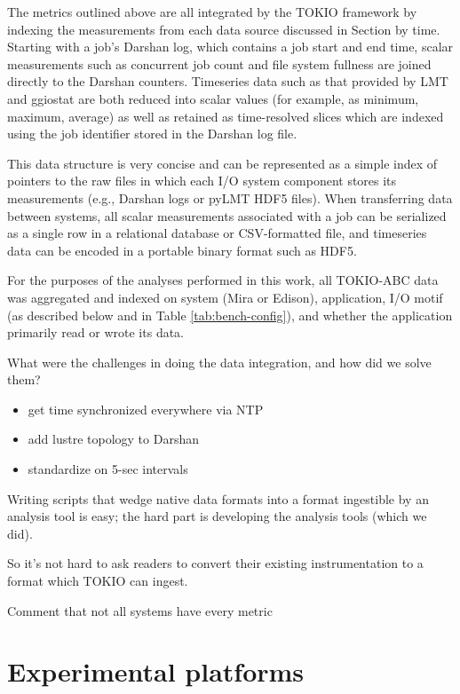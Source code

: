 The metrics outlined above are all integrated by the TOKIO framework by indexing the measurements from each data source discussed in Section \label{sec:methods} by time.
Starting with a job's Darshan log, which contains a job start and end time, scalar measurements such as concurrent job count and file system fullness are joined directly to the Darshan counters.
Timeseries data such as that provided by LMT and ggiostat are both reduced into scalar values (for example, as minimum, maximum, average) as well as retained as time-resolved slices which are indexed using the job identifier stored in the Darshan log file.

This data structure is very concise and can be represented as a simple index of pointers to the raw files in which each I/O system component stores its measurements (e.g., Darshan logs or pyLMT HDF5 files).
When transferring data between systems, all scalar measurements associated with a job can be serialized as a single row in a relational database or CSV-formatted file, and timeseries data can be encoded in a portable binary format such as HDF5.

For the purposes of the analyses performed in this work, all TOKIO-ABC data was aggregated and indexed on system (Mira or Edison), application, I/O motif (as described below and in Table \ref{tab:bench-config}), and whether the application primarily read or wrote its data. 


What were the challenges in doing the data integration, and how did we solve them?

\begin{itemize}
    \item get time synchronized everywhere via NTP
    \item add lustre topology to Darshan
    \item standardize on 5-sec intervals
\end{itemize}

Writing scripts that wedge native data formats into a format ingestible by an analysis tool is easy; the hard part is developing the analysis tools (which we did).

So it's not hard to ask readers to convert their existing instrumentation to a format which TOKIO can ingest.

Comment that not all systems have every metric

\section{Experimental platforms} \label{sec:platforms}

